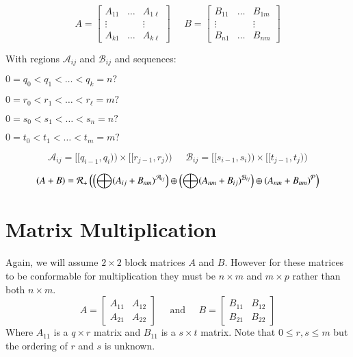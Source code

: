 \begin{equation*}
	A = \begin{bmatrix}
		A_{11} & \ldots & A_{1\ell}\\
		\vdots & & \vdots \\
		A_{k1} & \ldots & A_{k\ell}	
	\end{bmatrix}
	\;\;\;\;\;
	B = \begin{bmatrix}
		B_{11} & \ldots & B_{1m}\\
		\vdots & & \vdots \\
		B_{n1} & \ldots & B_{nm}	
	\end{bmatrix}
\end{equation*}


With regions $\mathcal{A}_{ij}$ and $\mathcal{B}_{ij}$
and sequences:
 
$0 = q_0 < q_1 < \ldots < q_k = n?$ 
 
$0 = r_0 < r_1 < \ldots < r_\ell = m?$ 
 
$0 = s_0 < s_1 < \ldots < s_n = n?$ 
  
$0 = t_0 < t_1 < \ldots < t_m = m?$ 

\begin{equation*}
	\mathcal{A}_{ij} = [\![q_{i-1}, q_i )\!) \times [\![ r_{j-1}, r_{j} )\!)
	\;\;\;\;\;
	\mathcal{B}_{ij} = [\![s_{i-1}, s_i )\!) \times [\![ t_{j-1}, t_{j} )\!)
\end{equation*}


\begin{equation}
	(A+B) = \R[+] \left( 
		\left( \bigoplus (A_{ij} + B_{nm})^{\mathcal{A}_{ij}} \right) \oplus
		\left( \bigoplus (A_{nm} + B_{ij})^{\mathcal{B}_{ij}} \right) \oplus
			(A_{nm} + B_{nm})^{\mathcal{P}} 
	\right)
\end{equation}


%
\section{Matrix Multiplication}



Again, we will assume $2 \times 2$ block matrices $A$ and $B$.
However for these matrices to be conformable for multiplication they must be  $n \times m$ and $m \times p$ rather than
both $n \times m$.
\begin{equation}
	A = \left[ \begin{array}{cc} A_{11} & A_{12} \\ A_{21} & A_{22} \end{array} \right]
	\;\;\;\;\; \text{and} \;\;\;\;\;
	B = \left[ \begin{array}{cc} B_{11} & B_{12} \\ B_{21} & B_{22} \end{array} \right]
\end{equation}
Where $A_{11}$ is a $q \times r$ matrix and $B_{11}$ is a $s \times t$ matrix.
Note that $0 \leq r , s \leq m$ but the ordering of $r$ and $s$ is unknown.

